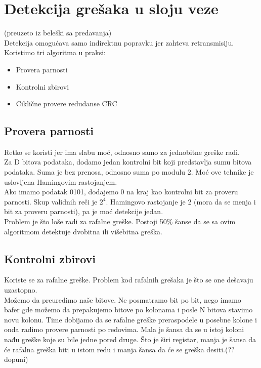 \documentclass{article} %
\begin{document}
\section{Detekcija grešaka u sloju veze}
(preuzeto iz beleški sa predavanja)\\

Detekcija omogućava samo indirektnu  popravku jer zahteva retransmisiju. Koristimo tri algoritma u praksi:
\begin{itemize}
  \item Provera parnosti
  \item Kontrolni zbirovi
  \item Ciklične provere redudanse CRC
\end{itemize}
\subsection{Provera parnosti}
Retko se koristi jer ima slabu moć, odnosno samo za jednobitne greške radi.\\
Za D bitova podataka, dodamo jedan kontrolni bit koji predstavlja sumu bitova podataka. Suma je bez prenosa, odnosno suma po modulu 2. Moć ove tehnike je uslovljena Hamingovim rastojanjem. \\
Ako imamo podatak 0101, dodajemo 0 na kraj kao kontrolni bit za proveru parnosti. Skup validnih reči je $ 2^{4} $. Hamingovo rastojanje je 2 (mora da se menja i bit za proveru parnosti), pa je moć detekcije jedan. \\
 Problem je što loše radi za rafalne greške. Postoji 50\% šanse da se sa ovim algoritmom detektuje dvobitna ili višebitna greška.
 
\subsection{Kontrolni zbirovi}
Koriste se za rafalne greške. Problem kod rafalnih grešaka je što se one dešavaju uzastopno.\\
Možemo da preuredimo naše bitove. Ne posmatramo bit po bit, nego imamo bafer gde možemo da prepakujemo bitove po kolonama i posle N bitova stavimo novu kolonu. Time dobijamo da se rafalne greške preraspodele u posebne kolone i onda radimo provere parnosti po redovima. Mala je šansa da se u istoj koloni nađu greške koje su bile jedne pored druge. Što je širi registar, manja je šansa da će rafalna greška biti u istom redu i manja šansa da će se greška desiti.(?? dopuni)
\end{document}

